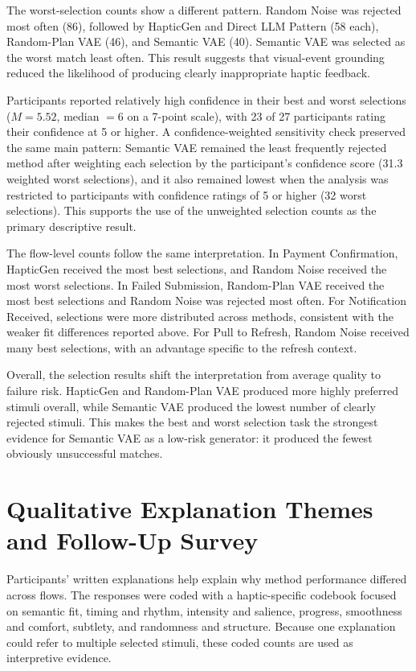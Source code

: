 The worst-selection counts show a different pattern. Random Noise was rejected most often (86), followed by HapticGen and Direct LLM Pattern (58 each), Random-Plan VAE (46), and Semantic VAE (40). Semantic VAE was selected as the worst match least often. This result suggests that visual-event grounding reduced the likelihood of producing clearly inappropriate haptic feedback.

Participants reported relatively high confidence in their best and worst selections ($M=5.52$, median $=6$ on a 7-point scale), with 23 of 27 participants rating their confidence at 5 or higher. A confidence-weighted sensitivity check preserved the same main pattern: Semantic VAE remained the least frequently rejected method after weighting each selection by the participant's confidence score (31.3 weighted worst selections), and it also remained lowest when the analysis was restricted to participants with confidence ratings of 5 or higher (32 worst selections). This supports the use of the unweighted selection counts as the primary descriptive result.

The flow-level counts follow the same interpretation. In Payment Confirmation, HapticGen received the most best selections, and Random Noise received the most worst selections. In Failed Submission, Random-Plan VAE received the most best selections and Random Noise was rejected most often. For Notification Received, selections were more distributed across methods, consistent with the weaker fit differences reported above. For Pull to Refresh, Random Noise received many best selections, with an advantage specific to the refresh context.

Overall, the selection results shift the interpretation from average quality to failure risk. HapticGen and Random-Plan VAE produced more highly preferred stimuli overall, while Semantic VAE produced the lowest number of clearly rejected stimuli. This makes the best and worst selection task the strongest evidence for Semantic VAE as a low-risk generator: it produced the fewest obviously unsuccessful matches.

\section{Qualitative Explanation Themes and Follow-Up Survey}

Participants' written explanations help explain why method performance differed across flows. The responses were coded with a haptic-specific codebook focused on semantic fit, timing and rhythm, intensity and salience, progress, smoothness and comfort, subtlety, and randomness and structure. Because one explanation could refer to multiple selected stimuli, these coded counts are used as interpretive evidence.

